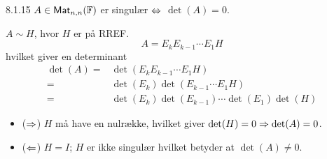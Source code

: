 %
%

\begin{saetning}{8.1.15}
	$A \in \textsf{Mat}_{n,n}(\mathbb{F})$ er singulær $\Leftrightarrow$ $\det(A)=0$.
\end{saetning}

\begin{bevis}
	$A \sim H$, hvor $H$ er på RREF.
	\[
		A=E_k E_{k-1} \cdots E_1 H
	\]
	hvilket giver en determinant
	\begin{align*}
		\det(A) =& \det(E_k E_{k-1} \cdots E_1 H) \\
			=& \det(E_k)\det(E_{k-1} \cdots E_1 H) \\
			=& \det(E_k)\det(E_{k-1}) \cdots \det(E_1)\det(H)
	\end{align*}

	\begin{itemize}
		\item ($\Rightarrow$) $H$ må have en nulrække, hvilket giver $\det(H) = 0 \Rightarrow 
			\det(A) = 0$.
		\item ($\Leftarrow$) $H=I$; $H$ er ikke singulær hvilket betyder at $\det(A)
			\ne 0$.
	\end{itemize}
\end{bevis}
